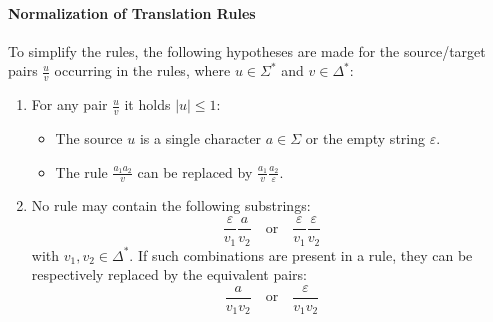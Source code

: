 \paragraph*{Normalization of Translation Rules}
To simplify the rules, the following hypotheses are made for the source/target pairs $\frac{u}{v}$ occurring in the rules, where $u \in \Sigma^{*}$ and $v \in \Delta^{*}$:
\begin{enumerate}
    \item For any pair $\frac{u}{v}$ it holds $|u| \leq 1$: 
        \begin{itemize}
            \item The source $u$ is a single character $a \in \Sigma$ or the empty string $\varepsilon$.
            \item The rule $\frac{a_1 a_2}{v}$ can be replaced by $\frac{a_1}{v}\frac{a_2}{\varepsilon}$.
        \end{itemize}
    \item No rule may contain the following substrings:
        \[ \dfrac{\varepsilon}{v_1} \dfrac{a}{v_2} \quad \text{or} \quad \dfrac{\varepsilon}{v_1} \dfrac{\varepsilon}{v_2} \]
        with $v_1, v_2 \in \Delta^{*}$. 
        If such combinations are present in a rule, they can be respectively replaced by the equivalent pairs: 
        \[ \dfrac{a}{v_1 v_2} \quad \text{or} \quad \dfrac{\varepsilon}{v_1 v_2} \]
\end{enumerate}

